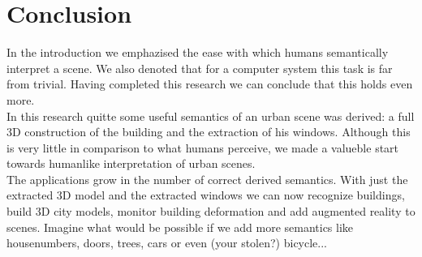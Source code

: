 \section{Conclusion}
In the introduction we emphazised the ease with which humans semantically
interpret a scene.  We also denoted that for a computer system this task is far
from trivial. Having completed this research we can conclude that this holds even
more.\\

In this research quitte some useful semantics of an urban scene was derived: a
full 3D construction of the building and the extraction of his windows.
Although this is very little in comparison to what humans perceive, we made a
valueble start towards humanlike interpretation of urban scenes.\\

The applications grow in the number of correct derived semantics. With just the
extracted 3D model and the extracted windows we can now recognize buildings,
build 3D city models, monitor building deformation and add augmented reality
to scenes.  Imagine what would be possible if we add more semantics like
housenumbers, doors, trees, cars or even (your stolen?) bicycle...
